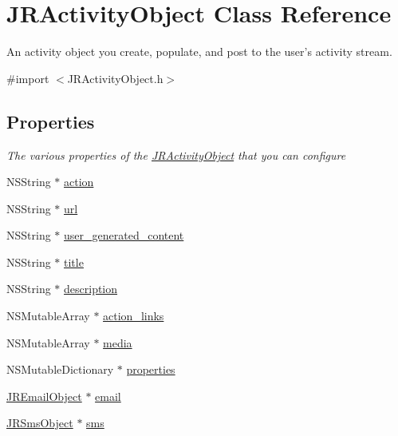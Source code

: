 \hypertarget{interface_j_r_activity_object}{
\section{JRActivityObject Class Reference}
\label{interface_j_r_activity_object}
}


An activity object you create, populate, and post to the user's activity stream.  




{\ttfamily \#import $<$JRActivityObject.h$>$}

\subsection*{Properties}
\begin{Indent}{\bf }\par
{\em \label{_amgrpd41d8cd98f00b204e9800998ecf8427e}
 The various properties of the \hyperlink{interface_j_r_activity_object}{JRActivityObject} that you can configure }\begin{DoxyCompactItemize}
\item 
NSString $\ast$ \hyperlink{interface_j_r_activity_object_ac7f87878433a7d69fc5c8677fc317d6a}{action}
\item 
NSString $\ast$ \hyperlink{interface_j_r_activity_object_a113d240b8b15e625fb0005fbffd00c17}{url}
\item 
NSString $\ast$ \hyperlink{interface_j_r_activity_object_a965d03730324bcda4374450ad648505b}{user\_\-generated\_\-content}
\item 
NSString $\ast$ \hyperlink{interface_j_r_activity_object_ae64ba976e73c3926a04c46ba0aeba583}{title}
\item 
NSString $\ast$ \hyperlink{interface_j_r_activity_object_a35d4fcb4e1aaa9d6325333228104604f}{description}
\item 
NSMutableArray $\ast$ \hyperlink{interface_j_r_activity_object_aa5c629e1c3b8306b2532ab647f7f6ec5}{action\_\-links}
\item 
NSMutableArray $\ast$ \hyperlink{interface_j_r_activity_object_a2e4ff78f83d0f353f8e0c17ed48ce0ab}{media}
\item 
NSMutableDictionary $\ast$ \hyperlink{interface_j_r_activity_object_a1acf84854d275510685a1f2066061c4e}{properties}
\item 
\hyperlink{interface_j_r_email_object}{JREmailObject} $\ast$ \hyperlink{interface_j_r_activity_object_aa26818070a5987c70ef14700d6f6c72c}{email}
\item 
\hyperlink{interface_j_r_sms_object}{JRSmsObject} $\ast$ \hyperlink{interface_j_r_activity_object_a7719b59135bd02dbd03d4b35b17cb0a0}{sms}
\end{DoxyCompactItemize}
\end{Indent}
